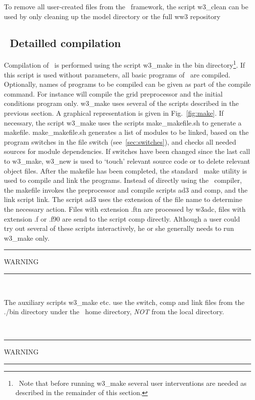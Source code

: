 To remove all user-created files from the \ws\ framework, the script 
{\file w3\_clean} can be used by only cleaning up the {\dir model} directory
 or the full ww3 repository 


\vssub
\subsection{~Detailled compilation}
\vssub

Compilation of \ws\ is performed using the script {\file w3\_make} in the
{\dir bin} directory\footnote{~Note that before running {\file w3\_make}
  several user interventions are needed as described in the remainder of this
  section.}.  If this script is used without parameters, all basic programs of
\ws\ are compiled. Optionally, names of programs to be compiled can be given
as part of the compile command. For instance  will compile the grid preprocessor and the initial conditions
program only. {\file w3\_make} uses several of the scripts described in the
previous section. A graphical representation is given in Fig.~\ref{fig:make}.
If necessary, the script {\file w3\_make} uses the scripts {\file
  make\_makefile.sh} to generate a makefile. {\file make\_makefile.sh}
generates a list of modules to be linked, based on the program switches in the
file {\file switch} (see~\para\ref{sec:switches}), and checks all needed
sources for module dependencies. If switches have been changed since the last
call to {\file w3\_make}, {\file w3\_new} is used to `touch' relevant source
code or to delete relevant object files. After the makefile has been
completed, the standard \unix\ make utility is used to compile and link the
programs. Instead of directly using the \fortran\ compiler, the makefile
invokes the preprocessor and compile scripts {\file ad3} and {\file comp}, and
the link script {\file link}. The script {\file ad3} uses the extension of the
file name to determine the necessary action. Files with extension {\file .ftn}
are processed by {\code w3adc}, files with extension {\file .f} or {\file
  .f90} are send to the script {\code comp} directly.  Although a user could
try out several of these scripts interactively, he or she generally needs to
run {\file w3\_make} only.

 

\vspace{\baselineskip}

\begin{center}
\rule[1mm]{55mm}{1.0mm} WARNING \rule[1mm]{55mm}{1.0mm} \\
\vspace{\baselineskip}
\parbox{120mm}{The auxiliary scripts {\file w3\_make} etc. use the {\file
  switch}, {\file comp} and {\file link} files from the {\file ./bin}
  directory under the \ws\ home directory, {\it NOT} from the local
  directory.} \\ \vspace{\baselineskip} \rule[1mm]{55mm}{1.0mm} WARNING
  \rule[1mm]{55mm}{1.0mm}
\end{center}


